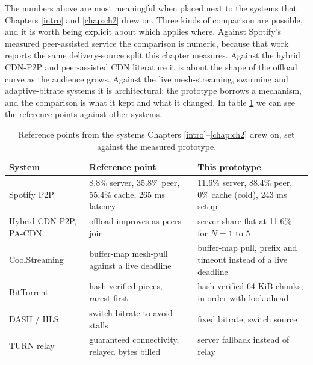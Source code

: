 \indent \par The numbers above are most meaningful when placed next to the systems that Chapters \ref{intro} and \ref{chap:ch2} drew on. Three kinds of comparison are possible, and it is worth being explicit about which applies where. Against Spotify's measured peer-assisted service the comparison is numeric, because that work reports the same delivery-source split this chapter measures. Against the hybrid CDN-P2P and peer-assisted CDN literature it is about the shape of the offload curve as the audience grows. Against the live mesh-streaming, swarming and adaptive-bitrate systems it is architectural: the prototype borrows a mechanism, and the comparison is what it kept and what it changed. In table \ref{tab:eval-comparison} we can see the reference points against other systems.

\begin{table}[htbp]
\centering
\begin{tabular}{|p{3.4cm}|p{4.4cm}|p{4.4cm}|}
\hline
\textbf{System} & \textbf{Reference point} & \textbf{This prototype} \\
\hline
Spotify P2P \cite{spotify_p2p} & 8.8\% server, 35.8\% peer, 55.4\% cache, 265 ms latency & 11.6\% server, 88.4\% peer, 0\% cache (cold), 243 ms setup \\
\hline
Hybrid CDN-P2P, PA-CDN \cite{hybrid_cdn_p2p,pa_cdn_survey} & offload improves as peers join & server share flat at 11.6\% for $N=1$ to $5$ \\
\hline
CoolStreaming \cite{coolstreaming} & buffer-map mesh-pull against a live deadline & buffer-map pull, prefix and timeout instead of a live deadline \\
\hline
BitTorrent \cite{bittorent} & hash-verified pieces, rarest-first & hash-verified 64 KiB chunks, in-order with look-ahead \\
\hline
DASH / HLS \cite{standards_streaming_http,hls_rfc8216} & switch bitrate to avoid stalls & fixed bitrate, switch source \\
\hline
TURN relay \cite{relays_turn} & guaranteed connectivity, relayed bytes billed & server fallback instead of relay \\
\hline
\end{tabular}
\caption{Reference points from the systems Chapters \ref{intro}--\ref{chap:ch2} drew on, set against the measured prototype.}
\label{tab:eval-comparison}
\end{table}

